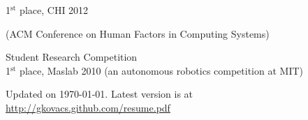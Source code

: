 \documentclass[margin,line]{resume}
\begin{document}
\begin{resume}
1$^{\textrm{st}}$ place, CHI 2012 \begin{small}(ACM Conference on Human Factors in Computing Systems)\end{small} Student Research Competition\\
1$^{\textrm{st}}$ place, Maslab 2010 (an autonomous robotics competition at MIT)

\vspace{-3mm}

\begin{small}
\begin{center}
Updated on \today. Latest version is at \url{http://gkovacs.github.com/resume.pdf}
\end{center}
\end{small}

\end{resume}
\end{document}
